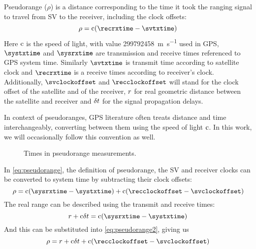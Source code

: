 Pseudorange (\(\rho\)) is a distance corresponding to the time it took the ranging
signal to travel from SV to the receiver, including the clock offsets:
\begin{equation}
	\label{eq:pseudorange}
	\rho = \speedoflight (\recrxtime - \svtxtime)
\end{equation}
Here \(\mathrm{c}\) is the speed of light, with value \SI{299792458}{\meter\per\second} used in GPS,
\(\systxtime\) and \(\sysrxtime\) are transmission and receive times referenced to GPS system time.
Similarly \(\svtxtime\) is transmit time according to satellite clock and
\(\recrxtime\) is a receive times according to receiver's clock.
Additionally, \(\svclockoffset\) and \(\recclockoffset\) will stand for the clock offset of the satellite
and of the receiver, \(r\) for real geometric distance between the satellite and receiver
and \(\delta{t}\) for the signal propagation delays.

In context of pseudoranges, GPS literature often treats distance and time
interchangeably, converting between them using the speed of light \(\mathrm{c}\).
In this work, we will occasionally follow this convention as well.

\begin{figure}[tb]
	\centering
	
	\caption{Times in pseudorange measurements.}
	\label{fig:pseudorange}
\end{figure}

In \eqref{eq:pseudorange}, the definition of pseudorange, the SV and receiver clocks can be
converted to system time by subtracting their clock offsets:
\begin{equation}
	\label{eq:pseudorange2}
	\rho = \speedoflight (\sysrxtime - \systxtime) + \speedoflight (\recclockoffset - \svclockoffset)
\end{equation}
The real range can be described using the transmit and receive times:
\begin{equation}
	\geomrange + \speedoflight\geomrangedelays = \speedoflight (\sysrxtime - \systxtime)
\end{equation}
And this can be substituted into \eqref{eq:pseudorange2}, giving us
\begin{equation}
	\rho = \geomrange + \speedoflight\geomrangedelays + \speedoflight (\recclockoffset - \svclockoffset)
\end{equation}


